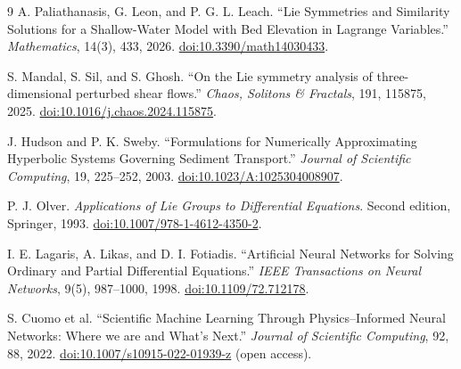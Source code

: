 \documentclass[12pt,a4paper]{article}
\begin{document}
\newpage
\begin{thebibliography}{9}
\setlength{\itemsep}{3pt}
\setlength{\parskip}{0pt}
A. Paliathanasis, G. Leon, and P. G. L. Leach.
``Lie Symmetries and Similarity Solutions for a Shallow-Water Model with Bed Elevation in Lagrange Variables.''
\emph{Mathematics}, 14(3), 433, 2026.
\href{https://doi.org/10.3390/math14030433}{doi:10.3390/math14030433}.

S. Mandal, S. Sil, and S. Ghosh.
``On the Lie symmetry analysis of three-dimensional perturbed shear flows.''
\emph{Chaos, Solitons \& Fractals}, 191, 115875, 2025.
\href{https://doi.org/10.1016/j.chaos.2024.115875}{doi:10.1016/j.chaos.2024.115875}.

J. Hudson and P. K. Sweby.
``Formulations for Numerically Approximating Hyperbolic Systems Governing Sediment Transport.''
\emph{Journal of Scientific Computing}, 19, 225--252, 2003.
\href{https://doi.org/10.1023/A:1025304008907}{doi:10.1023/A:1025304008907}.

P. J. Olver. \emph{Applications of Lie Groups to Differential Equations}.
Second edition, Springer, 1993.
\href{https://doi.org/10.1007/978-1-4612-4350-2}{doi:10.1007/978-1-4612-4350-2}.

I. E. Lagaris, A. Likas, and D. I. Fotiadis.
``Artificial Neural Networks for Solving Ordinary and Partial Differential Equations.''
\emph{IEEE Transactions on Neural Networks}, 9(5), 987--1000, 1998.
\href{https://doi.org/10.1109/72.712178}{doi:10.1109/72.712178}.

S. Cuomo et al.
``Scientific Machine Learning Through Physics--Informed Neural Networks: Where we are and What's Next.''
\emph{Journal of Scientific Computing}, 92, 88, 2022.
\href{https://doi.org/10.1007/s10915-022-01939-z}{doi:10.1007/s10915-022-01939-z} (open access).
\end{thebibliography}
\end{document}
